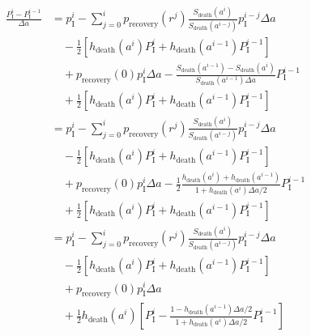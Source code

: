 \documentclass[12pt]{article}
\begin{document}
\begin{equation}
  \begin{split}
    \frac{P_{\mathrm{I}}^i - P_{\mathrm{I}}^{i - 1}}{\Delta a}
    &= p_{\mathrm{I}}^i
    - \sum_{j = 0}^i p_{\text{recovery}}(r^j)
    \frac{S_{\text{death}}(a^i)}{S_{\text{death}}(a^{i - j})}
    p_{\mathrm{I}}^{i - j} \Delta a
    \\ & \quad {}
    - \frac{1}{2} \left[h_{\text{death}}(a^i) P_{\mathrm{I}}^i
      + h_{\text{death}}(a^{i - 1}) P_{\mathrm{I}}^{i - 1}\right]
    \\ & \quad {}
    + p_{\text{recovery}}(0) p_{\mathrm{I}}^i \Delta a
    - \frac{S_{\text{death}}(a^{i - 1}) - S_{\text{death}}(a^i)}
    {S_{\text{death}}(a^{i - 1}) \Delta a}
    P_{\mathrm{I}}^{i - 1}
    \\ & \quad {}
    + \frac{1}{2} \left[h_{\text{death}}(a^i) P_{\mathrm{I}}^i
      + h_{\text{death}}(a^{i - 1}) P_{\mathrm{I}}^{i - 1}\right]
    \\
    &= p_{\mathrm{I}}^i
    - \sum_{j = 0}^i p_{\text{recovery}}(r^j)
    \frac{S_{\text{death}}(a^i)}{S_{\text{death}}(a^{i - j})}
    p_{\mathrm{I}}^{i - j} \Delta a
    \\ & \quad {}
    - \frac{1}{2} \left[h_{\text{death}}(a^i) P_{\mathrm{I}}^i
      + h_{\text{death}}(a^{i - 1}) P_{\mathrm{I}}^{i - 1}\right]
    \\ & \quad {}
    + p_{\text{recovery}}(0) p_{\mathrm{I}}^i \Delta a
    - \frac{1}{2}
    \frac{h_{\text{death}}(a^i) + h_{\text{death}}(a^{i - 1})}
    {1 + h_{\text{death}}(a^i) \Delta a / 2}
    P_{\mathrm{I}}^{i - 1}
    \\ & \quad {}
    + \frac{1}{2} \left[h_{\text{death}}(a^i) P_{\mathrm{I}}^i
      + h_{\text{death}}(a^{i - 1}) P_{\mathrm{I}}^{i - 1}\right]
    \\
    &= p_{\mathrm{I}}^i
    - \sum_{j = 0}^i p_{\text{recovery}}(r^j)
    \frac{S_{\text{death}}(a^i)}{S_{\text{death}}(a^{i - j})}
    p_{\mathrm{I}}^{i - j} \Delta a
    \\ & \quad {}
    - \frac{1}{2} \left[h_{\text{death}}(a^i) P_{\mathrm{I}}^i
      + h_{\text{death}}(a^{i - 1}) P_{\mathrm{I}}^{i - 1}\right]
    \\ & \quad {}
    + p_{\text{recovery}}(0) p_{\mathrm{I}}^i \Delta a
    \\ & \quad {}
    + \frac{1}{2} h_{\text{death}}(a^i)
    \left[P_{\mathrm{I}}^i
      - \frac{1 - h_{\text{death}}(a^{i - 1}) \Delta a / 2}
      {1 + h_{\text{death}}(a^i) \Delta a / 2}
      P_{\mathrm{I}}^{i - 1}\right]
  \end{split}
\end{equation}
\end{document}
